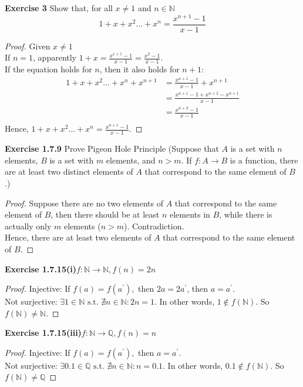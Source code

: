 \documentclass[12pt]{article}
\newcommand{\bbN}{\mathbb{N}}
\newcommand{\bbQ}{\mathbb{Q}}
\theoremstyle{definition}
\numberwithin{equation}{subsection}
\begin{document}
\textbf{Exercise 3} Show that, for all \(x \neq 1\) and \(n \in \mathbb{N}\)
$$
1+x+x^{2} \ldots+x^{n}=\frac{x^{n+1}-1}{x-1}
$$
\begin{proof}
Given $x\neq1$\\
If $n = 1$, apparently $1 + x = \frac{x^{1+1}-1}{x-1}= \frac{x^{2}-1}{x-1}$.\\
If the equation holds for $n$, then it also holds for $n+1$:\\
\begin{align*}
1+x+x^{2} \ldots+x^{n}+x^{n+1}
&=\frac{x^{n+1}-1}{x-1}+x^{n+1}\\
&=\frac{x^{n+1}-1+x^{n+2}-x^{n+1}}{x-1}\\
&=\frac{x^{n+2}-1}{x-1}\\
\end{align*}
Hence, $1+x+x^{2} \ldots+x^{n}=\frac{x^{n+1}-1}{x-1}$.
\end{proof}

\textbf{Exercise 1.7.9} Prove Pigeon Hole Principle (Suppose that \(A\) is a set with \(n\) elements, \(B\) is a set with \(m\) elements, and \(n>m\). If \(f: A \rightarrow B\) is a function, there
are at least two distinct elements of \(A\) that correspond to the same element
of \(B\).)
\begin{proof}
Suppose there are no two elements of $A$ that correspond to the same element of $B$, then there should be at least $n$ elements in $B$, while there is actually only $m$ elements ($n>m$). Contradiction.\\
Hence, there are at least two elements of $A$ that correspond to the same element of $B$.
\end{proof}

\textbf{Exercise 1.7.15(i)}\(f: \mathbb{N} \rightarrow \mathbb{N}, f(n)=2 n\)
\begin{proof}
Injective:
If \(f(a)=f\left(a^{\prime}\right),\) then \(2a=2a^{\prime}\), then \(a=a^{\prime}\).\\
Not surjective:
$\exists 1 \in \bbN \text{ s.t. } \nexists n \in \bbN: 2n=1.
$ In other words, $1 \notin f(\bbN)$.
So $f(\bbN) \neq \bbN$.
\end{proof}

\textbf{Exercise 1.7.15(iii)}\(f: \mathbb{N} \rightarrow \mathbb{Q}, f(n)=n\)
\begin{proof}
Injective:
If \(f(a)=f\left(a^{\prime}\right),\) then \(a=a^{\prime}\).\\
Not surjective:
$\exists 0.1 \in \bbQ \text{ s.t. } \nexists n \in \bbN: n=0.1.
$ In other words, $0.1 \notin f(\bbN)$.
So $f(\bbN) \neq \bbQ$
\end{proof}
\end{document}
